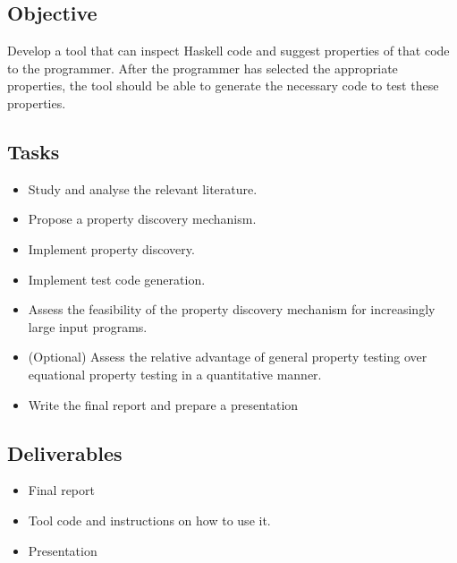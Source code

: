\documentclass[a4paper, 11pt]{article}
\begin{document}
\subsection{Objective}
Develop a tool that can inspect Haskell code and suggest properties of that code to the programmer.
After the programmer has selected the appropriate properties, the tool should be able to generate the necessary code to test these properties.

\subsection{Tasks}

\begin{itemize}
    \item Study and analyse the relevant literature.
    \item Propose a property discovery mechanism.
    \item Implement property discovery.
    \item Implement test code generation.
    \item Assess the feasibility of the property discovery mechanism for increasingly large input programs.
    \item (Optional) Assess the relative advantage of general property testing over equational property testing in a quantitative manner.
    \item Write the final report and prepare a presentation
\end{itemize}


\subsection{Deliverables}

\begin{itemize}
    \item Final report
    \item Tool code and instructions on how to use it.
    \item Presentation
\end{itemize}



\end{document}
